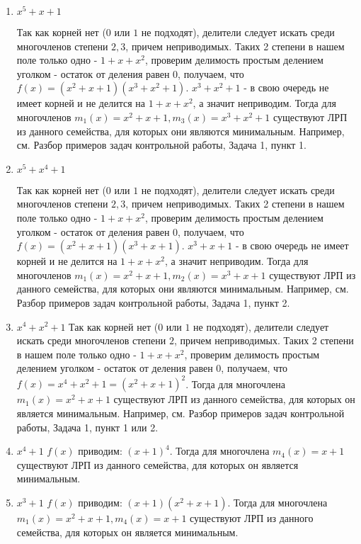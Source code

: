 \documentclass[utf8x, 14pt]{G7-32} %
\begin{document}
\begin{enumerate}
    \item $x^5+x+1$
    
     Так как корней нет ($0$ или $1$ не подходят), делители следует искать среди многочленов степени $2,3$, причем неприводимых. Таких 2 степени в нашем поле только одно - $1 + x + x^2$, проверим делимость простым делением уголком - остаток от деления равен $0$, получаем, что $f(x) = (x^2+x+1)(x^3+x^2+1)$. $x^3+x^2+1$ - в свою очередь не имеет корней и не делится на $1 + x + x^2$, а значит неприводим. Тогда для многочленов $m_1(x)=x^2+x+1, m_3(x) = x^3+x^2+1$ существуют ЛРП из данного семейства, для которых они  являются минимальным. Например, см. Разбор примеров задач контрольной работы, Задача 1, пункт 1.
     
     \item $x^5+x^4+1$
     
     Так как корней нет ($0$ или $1$ не подходят), делители следует искать среди многочленов степени $2,3$, причем неприводимых. Таких 2 степени в нашем поле только одно - $1 + x + x^2$, проверим делимость простым делением уголком - остаток от деления равен $0$, получаем, что $f(x) = (x^2+x+1)(x^3+x+1)$. $x^3+x+1$ - в свою очередь не имеет корней и не делится на $1 + x + x^2$, а значит неприводим. Тогда для многочленов $m_1(x)=x^2+x+1, m_2(x)=x^3+x+1$ существуют ЛРП из данного семейства, для которых они  являются минимальным.  Например, см. Разбор примеров задач контрольной работы, Задача 1, пункт 2.
     
     \item $x^4+x^2+1$
     Так как корней нет ($0$ или $1$ не подходят), делители следует искать среди многочленов степени $2$, причем неприводимых. Таких 2 степени в нашем поле только одно - $1 + x + x^2$, проверим делимость простым делением уголком - остаток от деления равен $0$, получаем, что $f(x) = x^4+x^2+1 = (x^2+x+1)^2$. Тогда для многочлена $m_1(x)=x^2+x+1$ существуют ЛРП из данного семейства, для которых он  является минимальным.  Например, см. Разбор примеров задач контрольной работы, Задача 1, пункт 1 или 2.
     
     \item $x^4+1$
     $f(x)$ приводим: $(x+1)^4$. Тогда для многочлена $m_4(x)=x+1$ существуют ЛРП из данного семейства, для которых он  является минимальным. 
     
     \item $x^3+1$
     $f(x)$ приводим: $(x+1)(x^2+x+1)$. Тогда для многочлена $m_1(x)=x^2+x+1, m_4(x)=x+1$ существуют ЛРП из данного семейства, для которых он  является минимальным. 
     
\end{enumerate}
\end{document}
